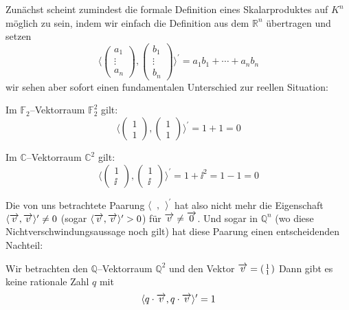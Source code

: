 Zunächst scheint zumindest die formale Definition eines Skalarproduktes auf $K^n$ 
möglich zu sein, indem wir einfach die Definition aus dem $\mathbb R^n$ übertragen 
und setzen
  	$$ \langle \left( \begin{matrix} a_1 \\ \vdots \\ a_n \end{matrix} \right), 
     	\left( \begin{matrix} b_1 \\ \vdots \\ b_n \end{matrix} \right) \rangle^{\prime}
    	= a_1 b_1 + \cdots + a_n b_n$$
wir sehen aber sofort einen fundamentalen Unterschied zur reellen Situation:

\begin{beispiel} Im $\mathbb F_2$--Vektorraum $\mathbb F_2^2$ gilt:
  	$$ \langle \left( \begin{matrix} 1 \\ 1 \end{matrix} \right), 
    	\left( \begin{matrix} 1 \\ 1 \end{matrix} \right) \rangle^{\prime} = 1 + 1 = 0 $$

Im $\mathbb C$--Vektorraum $\mathbb C^2$ gilt:
  	$$ \langle \left( \begin{matrix} 1 \\ \ii \end{matrix} \right), 
     \left( \begin{matrix} 1 \\ \ii \end{matrix} \right) \rangle^{\prime} = 1 + \ii^2 
     = 1 - 1 = 0 $$
\end{beispiel}

Die von uns betrachtete Paarung $\langle \phantom{a}, \phantom{b} \rangle^{\prime}$ hat 
also nicht mehr die Eigenschaft $\langle \overrightarrow{v}, \overrightarrow{v} 
\rangle^{\prime} \neq 0$ (sogar $\langle \overrightarrow{v}, \overrightarrow{v} 
\rangle^{\prime} > 0$) für $\overrightarrow{v} \neq \overrightarrow{0}$. Und sogar 
in $\mathbb Q^n$ (wo diese Nichtverschwindungsaussage noch gilt) hat diese Paarung 
einen entscheidenden Nachteil:

\begin{beispiel} Wir betrachten den $\mathbb Q$--Vektorraum $\mathbb Q^2$ und den Vektor 
$\overrightarrow{v} = \left( \begin{smallmatrix} 1 \\ 1 \end{smallmatrix} \right) $
Dann gibt es keine rationale Zahl $q$ mit 
  	$$ \langle q \cdot \overrightarrow{v}, q \cdot \overrightarrow{v} \rangle^{\prime} 
     	= 1 $$
\end{beispiel}

